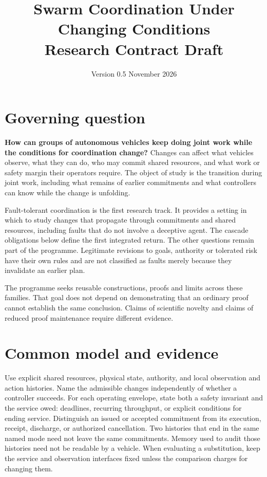 \documentclass[11pt]{article}
\title{Swarm Coordination Under Changing Conditions\\Research Contract Draft}
\author{}
\date{Version 0.5 \quad 24 November 2026}
\begin{document}
\maketitle

\section{Governing question}
\textbf{How can groups of autonomous vehicles keep doing joint work while the conditions for coordination change?} Changes can affect what vehicles observe, what they can do, who may commit shared resources, and what work or safety margin their operators require. The object of study is the transition during joint work, including what remains of earlier commitments and what controllers can know while the change is unfolding.

Fault-tolerant coordination is the first research track. It provides a setting in which to study changes that propagate through commitments and shared resources, including faults that do not involve a deceptive agent. The cascade obligations below define the first integrated return. The other questions remain part of the programme. Legitimate revisions to goals, authority or tolerated risk have their own rules and are not classified as faults merely because they invalidate an earlier plan.

The programme seeks reusable constructions, proofs and limits across these families. That goal does not depend on demonstrating that an ordinary proof cannot establish the same conclusion. Claims of scientific novelty and claims of reduced proof maintenance require different evidence.

\section{Common model and evidence}
Use explicit shared resources, physical state, authority, and local observation and action histories. Name the admissible changes independently of whether a controller succeeds. For each operating envelope, state both a safety invariant and the service owed: deadlines, recurring throughput, or explicit conditions for ending service. Distinguish an issued or accepted commitment from its execution, receipt, discharge, or authorized cancellation. Two histories that end in the same named mode need not leave the same commitments. Memory used to audit those histories need not be readable by a vehicle. When evaluating a substitution, keep the service and observation interfaces fixed unless the comparison charges for changing them.
\end{document}

